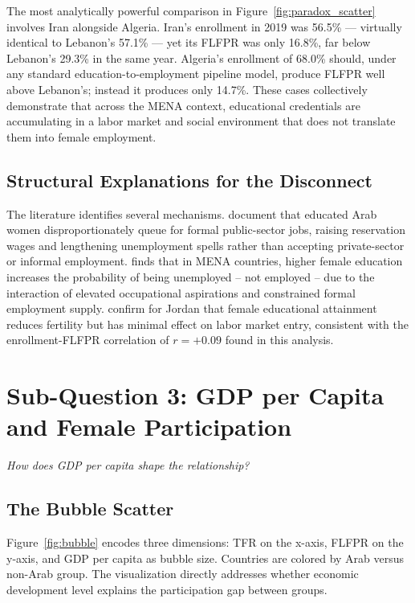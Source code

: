 \documentclass[12pt,a4paper]{article}
\begin{document}
The most analytically powerful comparison in Figure~\ref{fig:paradox_scatter} involves Iran alongside Algeria. Iran's enrollment in 2019 was 56.5\% --- virtually identical to Lebanon's 57.1\% --- yet its FLFPR was only 16.8\%, far below Lebanon's 29.3\% in the same year. Algeria's enrollment of 68.0\% should, under any standard education-to-employment pipeline model, produce FLFPR well above Lebanon's; instead it produces only 14.7\%. These cases collectively demonstrate that across the MENA context, educational credentials are accumulating in a labor market and social environment that does not translate them into female employment.

\subsection{Structural Explanations for the Disconnect}

The literature identifies several mechanisms. \citet{assaad2020} document that educated Arab women disproportionately queue for formal public-sector jobs, raising reservation wages and lengthening unemployment spells rather than accepting private-sector or informal employment. \citet{majbouri2020} finds that in MENA countries, higher female education increases the probability of being unemployed -- not employed -- due to the interaction of elevated occupational aspirations and constrained formal employment supply. \citet{zhang2024} confirm for Jordan that female educational attainment reduces fertility but has minimal effect on labor market entry, consistent with the enrollment-FLFPR correlation of $r = +0.09$ found in this analysis.

\section{Sub-Question 3: GDP per Capita and Female Participation}
\label{sec:gdp}

\textit{How does GDP per capita shape the relationship?}

\subsection{The Bubble Scatter}

Figure~\ref{fig:bubble} encodes three dimensions: TFR on the x-axis, FLFPR on the y-axis, and GDP per capita as bubble size. Countries are colored by Arab versus non-Arab group. The visualization directly addresses whether economic development level explains the participation gap between groups.
\end{document}
